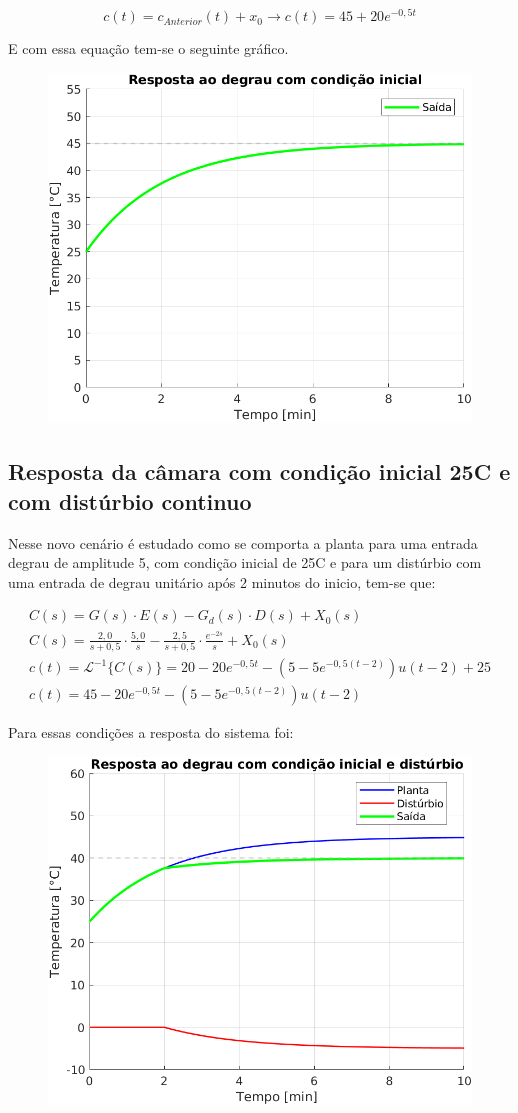 \documentclass[a4paper,12pt]{article}
\begin{document}
		\begin{equation}
			c(t) = c_{Anterior}(t) + x_0 \rightarrow c(t) = 45 + 20e^{-0,5t}
		\end{equation}
	
		E com essa equação tem-se o seguinte gráfico.
		
		\begin{figure}[H]
			\centering
			\includegraphics[width=0.5\linewidth]{images/respc.png}
			\label{fig:resposta_c}
		\end{figure}
	
	\subsection{Resposta da câmara com condição inicial 25\degree C e com distúrbio continuo}
		Nesse novo cenário é estudado como se comporta a planta para uma entrada degrau de amplitude 5, com condição inicial de 25\degree C e para um distúrbio com uma entrada de degrau unitário após 2 minutos do inicio, tem-se que:
		
		\begin{gather}
			C(s) = G(s) \cdot E(s) - G_d(s) \cdot D(s)  + X_0(s)\\[20pt]
			C(s) = \frac{2,0}{s+0,5} \cdot \frac{5,0}{s} - \frac{2,5}{s+0,5} \cdot \frac{e^{-2s}}{s} + X_0(s) \\[20pt]
			c(t) = \mathcal{L}^{-1} \{ C(s) \} = 20 - 20e^{-0,5t} - (5 - 5e^{-0,5(t-2)})u(t-2) + 25 \\[20pt]
			c(t) = 45 - 20e^{-0,5t} - (5 - 5e^{-0,5(t-2)})u(t-2)
		\end{gather}
	
		Para essas condições a resposta do sistema foi:
		
		\begin{figure}[H]
			\centering
			\includegraphics[width=0.5\linewidth]{images/respd.png}
			\label{fig:resposta_d}
		\end{figure}
	
\end{document}
